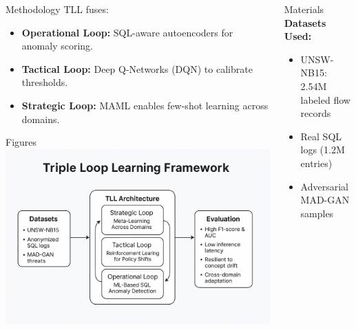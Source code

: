 \documentclass[final]{beamer}
\begin{document}
\begin{frame}[t]
\begin{columns}[t]
\begin{column}{0.32\textwidth}
\begin{block}{Methodology}
TLL fuses:
\begin{itemize}
    \item \textbf{Operational Loop:} SQL-aware autoencoders for anomaly scoring.
    \item \textbf{Tactical Loop:} Deep Q-Networks (DQN) to calibrate thresholds.
    \item \textbf{Strategic Loop:} MAML enables few-shot learning across domains.
\end{itemize}
\end{block}

\begin{block}{Figures}
\includegraphics[width=\linewidth]{images/Triple_Loop_Learning_Framework_Diagram.png}
\end{block}
\end{column}

\begin{column}{0.32\textwidth}
\begin{block}{Materials}
\textbf{Datasets Used:}
\begin{itemize}
    \item UNSW-NB15: 2.54M labeled flow records
    \item Real SQL logs (1.2M entries)
    \item Adversarial MAD-GAN samples
\end{itemize}
\end{block}


\end{column}
\end{columns}
\end{frame}
\end{document}
